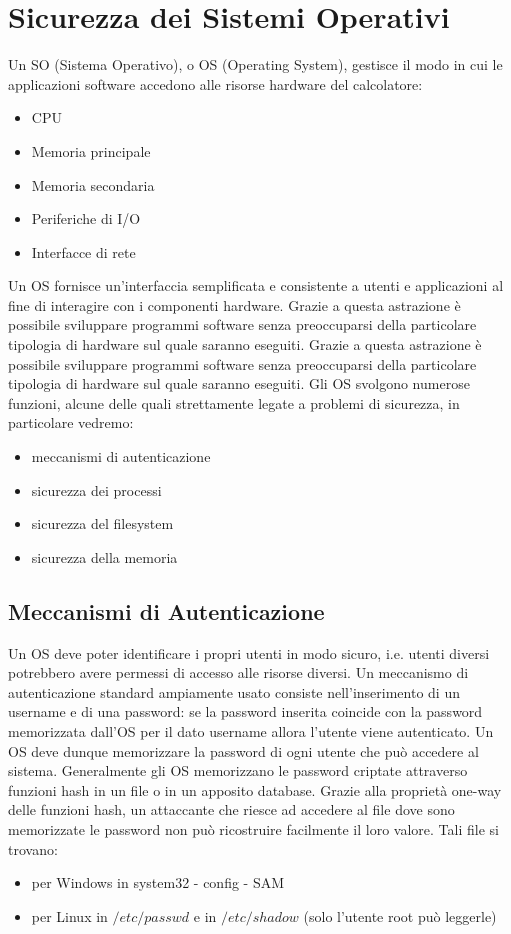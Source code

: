 \chapter{Sicurezza dei Sistemi Operativi}
Un SO (Sistema Operativo), o OS (Operating System), gestisce il modo in cui le applicazioni software accedono alle risorse hardware del calcolatore:
\begin{itemize} 
  \item CPU
  \item Memoria principale
  \item Memoria secondaria
  \item Periferiche di I/O
  \item Interfacce di rete
\end{itemize}
Un OS fornisce un’interfaccia semplificata e consistente a utenti e applicazioni al fine di interagire con i componenti hardware. Grazie a questa astrazione è possibile sviluppare programmi software senza preoccuparsi della particolare tipologia di hardware sul quale saranno eseguiti. Grazie a questa astrazione è possibile sviluppare programmi software senza preoccuparsi della particolare tipologia di hardware sul quale saranno eseguiti. Gli OS svolgono numerose funzioni, alcune delle quali strettamente legate a problemi di sicurezza, in particolare vedremo:
\begin{itemize} 
  \item meccanismi di autenticazione
  \item sicurezza dei processi
  \item sicurezza del filesystem
  \item sicurezza della memoria
\end{itemize}
\section{Meccanismi di Autenticazione}
Un OS deve poter identificare i propri utenti in modo sicuro, i.e. utenti diversi potrebbero avere permessi di accesso alle risorse diversi. Un meccanismo di autenticazione standard ampiamente usato consiste nell’inserimento di un username e di una password: se la password inserita coincide con la password memorizzata dall'OS per il dato username allora l'utente viene autenticato. Un OS deve dunque memorizzare la password di ogni utente che può accedere al sistema. Generalmente gli OS memorizzano le password criptate attraverso funzioni hash in un file o in un apposito database. Grazie alla proprietà one-way delle funzioni hash, un attaccante che riesce ad accedere al file dove sono memorizzate le password non può ricostruire facilmente il loro valore. Tali file si trovano:
\begin{itemize} 
  \item per Windows in system32 - config - SAM
  \item per Linux in $/etc/passwd$ e in $/etc/shadow$ (solo l’utente root può leggerle)
\end{itemize}

